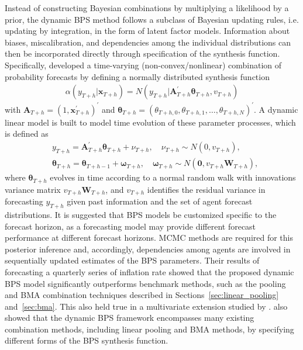 \documentclass[a4paper,11pt]{article}
\begin{document}
Instead of constructing Bayesian combinations by multiplying a likelihood by a prior, the dynamic BPS method follows a subclass of Bayesian updating rules, i.e. updating by integration, in the form of latent factor models. Information about biases, miscalibration, and dependencies among the individual distributions can then be incorporated directly through specification of the synthesis function. Specifically, \citet{McAlinn2019-kn} developed a time-varying (non-convex/nonlinear) combination of probability forecasts by defining a normally distributed synthesis function
\begin{align*}
  \alpha\left(y_{T+h} | \bm{x}_{T+h}\right)=N\left(y_{T+h} | \bm{A}_{T+h}^{\prime} \bm{\theta}_{T+h}, v_{T+h}\right)
\end{align*}
with $\bm{A}_{T+h}=\left(1, \bm{x}_{T+h}^{\prime}\right)^{\prime}$ and $\bm{\theta}_{T+h}=\left(\theta_{T+h, 0}, \theta_{T+h, 1}, \dots, \theta_{T+h, N}\right)^{\prime}$. A dynamic linear model is built to model time evolution of these parameter processes, which is defined as
\begin{align*}
   & y_{T+h}=\bm{A}_{T+h}^{\prime} \bm{\theta}_{T+h}+\nu_{T+h}, \quad \nu_{T+h} \sim N\left(0, v_{T+h}\right),                                                         \\
   & \bm{\theta}_{T+h}=\bm{\theta}_{T+h-1}+\bm{\omega}_{T+h}, \quad \bm{\omega}_{T+h} \sim N\left(\bm{0}, v_{T+h} \bm{W}_{T+h}\right),
\end{align*}
where $\bm{\theta}_{T+h}$ evolves in time according to a normal random walk with innovations variance matrix $v_{T+h} \bm{W}_{T+h}$, and $v_{T+h}$ identifies the residual variance in forecasting $y_{T+h}$ given past information and the set of agent forecast distributions. It is suggested that BPS models be customized specific to the forecast horizon, as a forecasting model may provide different forecast performance at different forecast horizons. MCMC methods are required for this posterior inference and, accordingly, dependencies among agents are involved in sequentially updated estimates of the BPS parameters. Their results of forecasting a quarterly series of inflation rate showed that the proposed dynamic BPS model significantly outperforms benchmark methods, such as the pooling and BMA combination techniques described in Sections~\ref{sec:linear_pooling} and~\ref{sec:bma}. This also held true in a multivariate extension studied by \citet{McAlinn2020-qq}. \citet{McAlinn2019-kn} also showed that the dynamic BPS framework encompasses many existing combination methods, including linear pooling and BMA methods, by specifying different forms of the BPS synthesis function.
\end{document}
